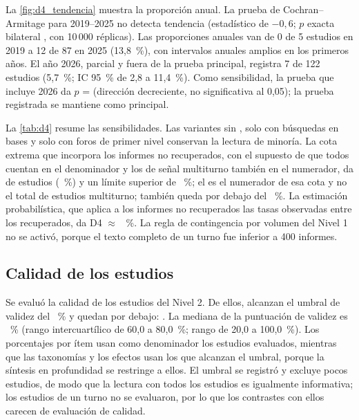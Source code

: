

La \cref{fig:d4_tendencia} muestra la proporción anual. La prueba de Cochran--Armitage para 2019--2025 no detecta tendencia (estadístico de $-0{,}6$; $p$ exacta bilateral \DcuatroTendenciaP{}, con 10\,000 réplicas). Las proporciones anuales van de 0 de 5 estudios en 2019 a 12 de 87 en 2025 (13,8~\%), con intervalos anuales amplios en los primeros años. El año 2026, parcial y fuera de la prueba principal, registra 7 de 122 estudios (5,7~\%; IC 95~\% de 2,8 a 11,4~\%). Como sensibilidad, la prueba que incluye 2026 da $p$ = \tendenciaConP{} (dirección decreciente, no significativa al 0,05); la prueba registrada se mantiene como principal.



La \cref{tab:d4} resume las sensibilidades. Las variantes sin , solo con búsquedas en bases y solo con foros de primer nivel conservan la lectura de minoría. La cota extrema que incorpora los informes no recuperados, con el supuesto de que todos cuentan en el denominador y los de señal multiturno también en el numerador, da \DcuatroCotaK{} de \DcuatroCotaN{} estudios (\DcuatroCotaPct~\%) y un límite superior de \DcuatroCotaICsup~\%; el \DcuatroCotaK{} es el numerador de esa cota y no el total de estudios multiturno; también queda por debajo del \umbralMayoria~\%. La estimación probabilística, que aplica a los informes no recuperados las tasas observadas entre los recuperados, da D4 $\approx$ \DcuatroProbPct~\%. La regla de contingencia por volumen del Nivel 1 no se activó, porque el texto completo de un turno fue inferior a 400 informes.



\subsection{Calidad de los estudios}
\label{sec:res-calidad}

Se evaluó la calidad de los \nMultiturno{} estudios del Nivel 2. De ellos, \nUmbral{} alcanzan el umbral de validez del \umbralValidez{}~\% y \nBajoUmbral{} quedan por debajo: \cite{Kochedykov2023Conversing,Joshi2020Natural,Lehmann2022Building,Parmar2026StocksTalk,ToctoInga2026CHIMLE}. La mediana de la puntuación de validez es \validezMediana{}~\% (rango intercuartílico de 60,0 a 80,0~\%; rango de 20,0 a 100,0~\%). Los porcentajes por ítem usan como denominador los \nMultiturno{} estudios evaluados, mientras que las taxonomías y los efectos usan los \nUmbral{} que alcanzan el umbral, porque la síntesis en profundidad se restringe a ellos. El umbral se registró y excluye pocos estudios, de modo que la lectura con todos los estudios es igualmente informativa; los estudios de un turno no se evaluaron, por lo que los contrastes con ellos carecen de evaluación de calidad.

